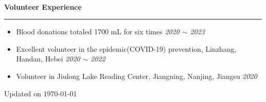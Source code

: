 \documentclass[12pt]{article}
\newcommand{\sect}[1]{
    ~\\ \noindent \textbf{#1} \medskip \hrule \medskip
}
\begin{document}

\sect{Volunteer Experience}

\begin{itemize}[noitemsep,nolistsep]
    \item Blood donations totaled 1700 mL for six times \hfill \textit{2020 $\sim$ 2023}
    \item Excellent volunteer in the epidemic(COVID-19) prevention, Linzhang, Handan, Hebei \hfill \textit{2020 $\sim$ 2022}
    \item Volunteer in Jiulong Lake Reading Center, Jiangning, Nanjing, Jiangsu \hfill \textit{2020}
\end{itemize}

\hfill {\tiny Updated on \today}
\end{document}
